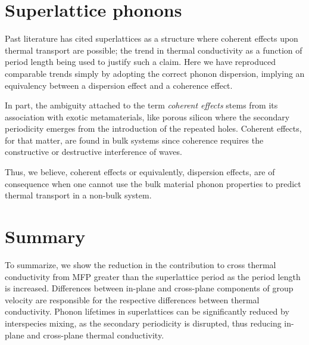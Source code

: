 \documentclass[aps,prb,preprint,preprintnumbers,amsmath,amssymb,floatfix,superscriptaddress]{revtex4}
\begin{document}
\section{Superlattice phonons}

Past literature has cited superlattices as a structure where coherent effects upon thermal transport are possible; the trend in thermal conductivity as a function of period length being used to justify such a claim. Here we have reproduced comparable trends simply by adopting the correct phonon dispersion, implying an equivalency between a dispersion effect and a coherence effect.

In part, the ambiguity attached to the term \textit {coherent effects} stems from its association with exotic metamaterials, like porous silicon where the secondary periodicity emerges from the introduction of the repeated holes. Coherent effects, for that matter, are found in bulk systems since coherence requires the constructive or destructive interference of waves.

Thus, we believe, coherent effects or equivalently, dispersion effects, are of consequence when one cannot use the bulk material phonon properties to predict thermal transport in a non-bulk system.

\section{Summary}

To summarize, we show the reduction in the contribution to cross thermal conductivity from MFP greater than the superlattice period as the period length is increased. Differences between in-plane and cross-plane components of group velocity are responsible for the respective differences between thermal conductivity. Phonon lifetimes in superlattices can be significantly reduced by interspecies mixing, as the secondary periodicity is disrupted, thus reducing in-plane and cross-plane thermal conductivity. 

\newpage
%

\end{document}
